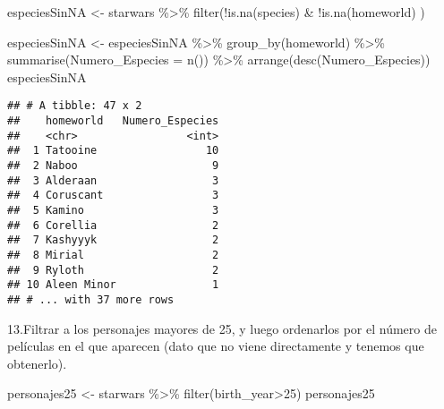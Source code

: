 \documentclass[
]{book}
\newenvironment{Shaded}{\begin{snugshade}}{\end{snugshade}}
\newcommand{\AttributeTok}[1]{\textcolor[rgb]{0.77,0.63,0.00}{#1}}
\newcommand{\DecValTok}[1]{\textcolor[rgb]{0.00,0.00,0.81}{#1}}
\newcommand{\FunctionTok}[1]{\textcolor[rgb]{0.00,0.00,0.00}{#1}}
\newcommand{\NormalTok}[1]{#1}
\newcommand{\OtherTok}[1]{\textcolor[rgb]{0.56,0.35,0.01}{#1}}
\newcommand{\SpecialCharTok}[1]{\textcolor[rgb]{0.00,0.00,0.00}{#1}}
\begin{document}
\begin{Shaded}
\begin{Highlighting}[]
\NormalTok{especiesSinNA }\OtherTok{\textless{}{-}}\NormalTok{ starwars }\SpecialCharTok{\%\textgreater{}\%} \FunctionTok{filter}\NormalTok{(}\SpecialCharTok{!}\FunctionTok{is.na}\NormalTok{(species) }\SpecialCharTok{\&} \SpecialCharTok{!}\FunctionTok{is.na}\NormalTok{(homeworld) )}

\NormalTok{especiesSinNA }\OtherTok{\textless{}{-}}\NormalTok{ especiesSinNA }\SpecialCharTok{\%\textgreater{}\%} \FunctionTok{group\_by}\NormalTok{(homeworld) }\SpecialCharTok{\%\textgreater{}\%} \FunctionTok{summarise}\NormalTok{(}\AttributeTok{Numero\_Especies =} \FunctionTok{n}\NormalTok{()) }\SpecialCharTok{\%\textgreater{}\%} \FunctionTok{arrange}\NormalTok{(}\FunctionTok{desc}\NormalTok{(Numero\_Especies))}
\NormalTok{especiesSinNA}
\end{Highlighting}
\end{Shaded}

\begin{verbatim}
## # A tibble: 47 x 2
##    homeworld   Numero_Especies
##    <chr>                 <int>
##  1 Tatooine                 10
##  2 Naboo                     9
##  3 Alderaan                  3
##  4 Coruscant                 3
##  5 Kamino                    3
##  6 Corellia                  2
##  7 Kashyyyk                  2
##  8 Mirial                    2
##  9 Ryloth                    2
## 10 Aleen Minor               1
## # ... with 37 more rows
\end{verbatim}

13.Filtrar a los personajes mayores de 25, y luego ordenarlos por el número de películas en el que aparecen (dato que no viene directamente y tenemos que obtenerlo).

\begin{Shaded}
\begin{Highlighting}[]
\NormalTok{personajes25 }\OtherTok{\textless{}{-}}\NormalTok{ starwars }\SpecialCharTok{\%\textgreater{}\%} \FunctionTok{filter}\NormalTok{(birth\_year}\SpecialCharTok{\textgreater{}}\DecValTok{25}\NormalTok{)}
\NormalTok{personajes25}
\end{Highlighting}
\end{Shaded}
\end{document}
